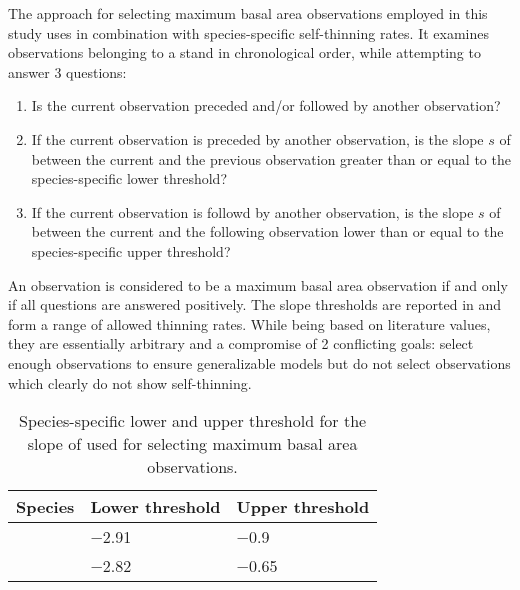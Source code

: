The approach for selecting maximum basal area observations employed in this study uses  in combination with species-specific self-thinning rates.  It examines observations belonging to a stand in chronological order, while attempting to answer 3 questions:
\begin{enumerate}
\item Is the current observation preceded and/or followed by another observation?
\item If the current observation is preceded by another observation, is the slope \(s\) of  between the current and the previous observation greater than or equal to the species-specific lower threshold?
\item If the current observation is followd by another observation, is the slope \(s\) of  between the current and the following observation lower than or equal to the species-specific upper threshold?
\end{enumerate}
An observation is considered to be a maximum basal area observation if and only if all questions are answered positively.
The slope thresholds are reported in  and form a range of allowed thinning rates.  While being based on literature values, they are essentially arbitrary and a compromise of 2 conflicting goals: select enough observations to ensure generalizable models but do not select observations which clearly do not show self-thinning.


\newpage{}  %
\begin{singlespace}
  {\tabulinesep=2mm
    \begin{longtabu}{L l l}
      \caption{Species-specific lower and upper threshold for the slope of  used for selecting maximum basal area observations.  \label{tab:ReinekeSlopeThresholds}} \\
      \toprule
      Species & Lower threshold & Upper threshold \\
      \midrule
      \endhead
      \bottomrule
      \endlastfoot
      \beech{} & \num{-2.91} & \num{-0.9} \\
      \spruce{} & \num{-2.82} & \num{-0.65} \\
    \end{longtabu}
  }
\end{singlespace}

